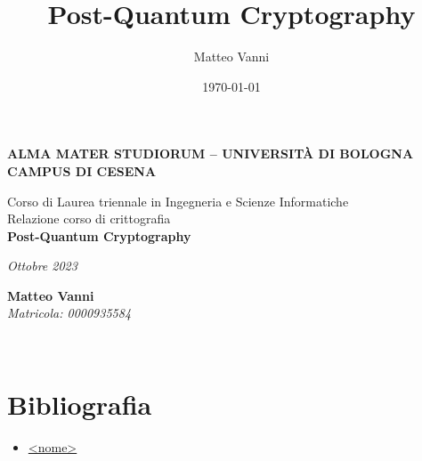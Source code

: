 \documentclass[12pt,a4paper,openright,oneside]{book}
\begin{document}
\title{Post-Quantum Cryptography}
\author{Matteo Vanni}
\date{\today}
 
\begin{titlepage}
\begin{center}
 
    \large
    \textbf{ALMA MATER STUDIORUM -- UNIVERSITÀ DI BOLOGNA\\CAMPUS DI CESENA}
\\
    \noindent\hrulefill
    \vspace{0.4cm}
 
    \Large
    Corso di Laurea triennale in Ingegneria e Scienze Informatiche\\
 
    \Huge
    \vspace{4cm}
    \Large
     Relazione corso di crittografia\\
    \textbf{
        Post-Quantum Cryptography
   }
 
    \large
    \vspace{1cm}
 
    \vspace{5.5cm}
    \begin{minipage}[t]{0.64\textwidth}
      \begin{flushleft}
        \textit{Ottobre 2023}
      \end{flushleft}
    \end{minipage}
    \begin{minipage}[t]{0.34\textwidth}
      \begin{flushright}
        \textbf{Matteo Vanni}
\\
        \textit{Matricola: 0000935584}
      \end{flushright}
    \end{minipage}\\
 
    \vfill
    \noindent\hrulefill
    \vspace{0.3cm}
    \Large
 
  \end{center}
\end{titlepage}
 
\titleformat{\chapter}{\normalfont\huge \bfseries}{\Huge \thechapter}{20pt}{\Huge}
\tableofcontents
 
\chapter{Bibliografia}
\begin{itemize}
    \item \href{<sito>}{<nome>}
\end{itemize}
\end{document}
